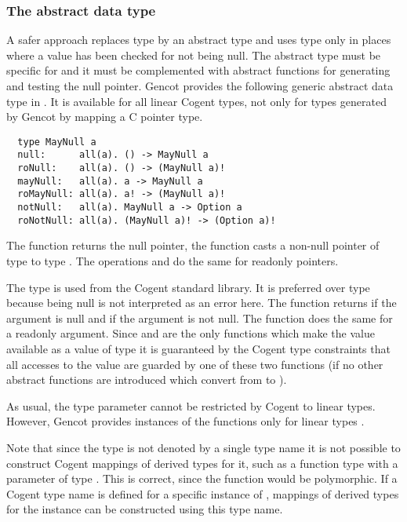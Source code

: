 \subsubsection{The abstract data type }

A safer approach replaces type  by an abstract type  and uses type  only in places where a value has been checked
for not being null. The abstract type must be specific for  and it must be complemented with abstract functions for
generating and testing the null pointer. Gencot provides the following generic abstract data type in .
It is available for all linear Cogent types, not only for types generated by Gencot by mapping a C pointer type.
\begin{verbatim}
  type MayNull a 
  null:      all(a). () -> MayNull a
  roNull:    all(a). () -> (MayNull a)!
  mayNull:   all(a). a -> MayNull a
  roMayNull: all(a). a! -> (MayNull a)!
  notNull:   all(a). MayNull a -> Option a
  roNotNull: all(a). (MayNull a)! -> (Option a)!
\end{verbatim}
The function  returns the null pointer, the function  casts a non-null pointer of type 
to type . The operations  and  do the same for readonly pointers. 

The type  is used from the Cogent standard library. It is preferred over type  because being null
is not interpreted as an error here.
The function  returns  if the argument is null and  if the argument  is not null.
The function  does the same for a readonly argument. 
Since  and  are the only functions which make the value available as a value of type  
it is guaranteed by the Cogent type constraints that all accesses to the value are guarded by one of these two functions
(if no other abstract functions are introduced which convert from  to ).

As usual,
the type parameter  cannot be restricted by Cogent to linear types. However, Gencot provides instances of the functions only for
linear types .

Note that since the type  is not denoted by a single type name it is not possible to construct Cogent mappings of 
derived types for it, such
as a function type with a parameter of type . This is correct, since the function would be polymorphic. If a Cogent type name 
is defined for a specific instance of , mappings of derived types for the instance can be constructed using this type name.

